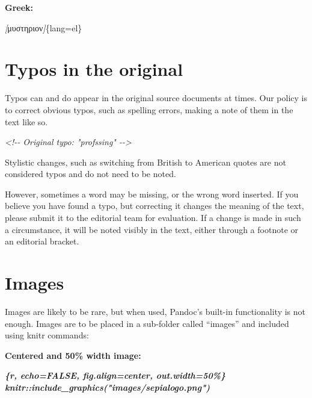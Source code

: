 \documentclass[
]{book}
\newenvironment{Shaded}{\begin{snugshade}}{\end{snugshade}}
\newcommand{\CommentTok}[1]{\textcolor[rgb]{0.56,0.35,0.01}{\textit{#1}}}
\newcommand{\InformationTok}[1]{\textcolor[rgb]{0.56,0.35,0.01}{\textbf{\textit{#1}}}}
\newcommand{\NormalTok}[1]{#1}
\newcommand{\OtherTok}[1]{\textcolor[rgb]{0.56,0.35,0.01}{#1}}
\begin{document}
\textbf{Greek:}

\begin{Shaded}
\begin{Highlighting}[]
\CommentTok{[}\OtherTok{μυστηριον}\CommentTok{]}\NormalTok{\{lang=el\}}
\end{Highlighting}
\end{Shaded}

\hypertarget{typos-in-the-original}{%
\chapter{Typos in the original}\label{typos-in-the-original}}

Typos can and do appear in the original source documents at times. Our policy is to correct obvious typos, such as spelling errors, making a note of them in the text like so.

\begin{Shaded}
\begin{Highlighting}[]
\CommentTok{\textless{}!{-}{-} Original typo: "profssing" {-}{-}\textgreater{}}
\end{Highlighting}
\end{Shaded}

Stylistic changes, such as switching from British to American quotes are not considered typos and do not need to be noted.

However, sometimes a word may be missing, or the wrong word inserted. If you believe you have found a typo, but correcting it changes the meaning of the text, please submit it to the editorial team for evaluation. If a change is made in such a circumstance, it will be noted visibly in the text, either through a footnote or an editorial bracket.

\hypertarget{images}{%
\chapter{Images}\label{images}}

Images are likely to be rare, but when used, Pandoc's built-in functionality is not enough. Images are to be placed in a sub-folder called ``images'' and included using knitr commands:

\textbf{Centered and 50\% width image:}

\begin{Shaded}
\begin{Highlighting}[]
\InformationTok{\textasciigrave{}\textasciigrave{}\textasciigrave{}\{r, echo=FALSE, fig.align=\textquotesingle{}center\textquotesingle{}, out.width=\textquotesingle{}50\%\textquotesingle{}\}}
\InformationTok{knitr::include\_graphics("images/sepialogo.png")}
\InformationTok{\textasciigrave{}\textasciigrave{}\textasciigrave{}}
\end{Highlighting}
\end{Shaded}
\end{document}
